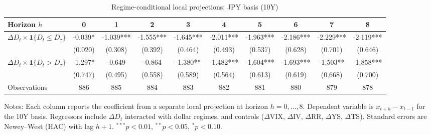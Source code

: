 \begin{table}[!htbp]\centering
\caption{Regime-conditional local projections: JPY basis (10Y)}
\label{tab:lp_jpy_10y}
\begin{tabular}{lccccccccc}
\toprule
Horizon $h$ & 0 & 1 & 2 & 3 & 4 & 5 & 6 & 7 & 8 \\
\midrule
$\Delta D_t \times \mathbf{1}\{D_t \le D_\tau\}$ & -0.039* & -1.039*** & -1.555*** & -1.645*** & -2.011*** & -1.963*** & -2.186*** & -2.229*** & -2.119*** \\
  & (0.020) & (0.308) & (0.392) & (0.464) & (0.493) & (0.537) & (0.628) & (0.701) & (0.646) \\
$\Delta D_t \times \mathbf{1}\{D_t > D_\tau\}$ & -1.297* & -0.649 & -0.864 & -1.380** & -1.482*** & -1.604*** & -1.693*** & -1.503** & -1.858*** \\
  & (0.747) & (0.495) & (0.558) & (0.589) & (0.564) & (0.613) & (0.619) & (0.668) & (0.700) \\
\midrule
Observations & 886 & 885 & 884 & 883 & 882 & 881 & 880 & 879 & 878 \\
\bottomrule
\end{tabular}
\begin{flushleft}\footnotesize Notes: Each column reports the coefficient from a separate local projection at horizon $h=0,\dots,8$. Dependent variable is $x_{t+h}-x_{t-1}$ for the 10Y basis. Regressors include $\Delta D_t$ interacted with dollar regimes, and controls ($\Delta$VIX, $\Delta$IV, $\Delta$RR, $\Delta$YS, $\Delta$TS). Standard errors are Newey--West (HAC) with lag $h+1$. $^{***}p<0.01$, $^{**}p<0.05$, $^{*}p<0.10$.\end{flushleft}
\end{table}